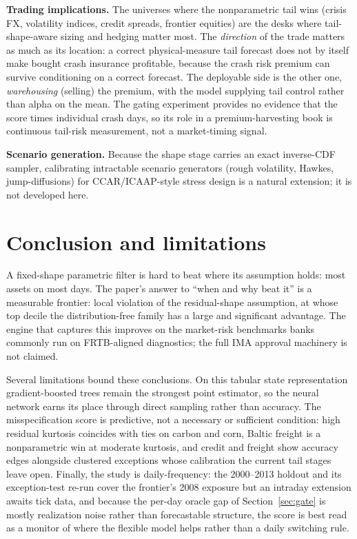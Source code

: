 \documentclass[11pt]{article}
\theoremstyle{remark}
\begin{document}
\textbf{Trading implications.} The universes where the nonparametric tail wins (crisis FX, volatility indices, credit spreads, frontier equities) are the desks where tail-shape-aware
sizing and hedging matter most. The \emph{direction} of the trade matters
as much as its location: a correct physical-measure tail forecast
does not by itself make bought crash insurance profitable, because the
crash risk premium can survive conditioning on a correct forecast.
The deployable side is the other one, \emph{warehousing} (selling) the premium, with the model supplying tail control rather than alpha on the mean. The
gating experiment provides no evidence that the score times individual
crash days, so its role in a premium-harvesting book is continuous
tail-risk measurement, not a market-timing signal.

\textbf{Scenario generation.} Because the shape stage carries an exact
inverse-CDF sampler, calibrating intractable scenario generators
(rough volatility, Hawkes, jump-diffusions) for CCAR/ICAAP-style
stress design is a natural extension; it is not developed here.

\section{Conclusion and limitations}\label{sec:limitations}

A fixed-shape parametric filter is hard to beat where its
assumption holds: most assets on most days. The paper's answer to
``when and why beat it'' is a measurable frontier: local violation of
the residual-shape assumption, at whose top decile the
distribution-free family has a large and significant advantage. The
engine that captures this improves on the market-risk benchmarks banks
commonly run on FRTB-aligned diagnostics; the full IMA approval
machinery is not claimed.

Several limitations bound these conclusions. On this tabular state
representation gradient-boosted trees remain the strongest point
estimator, so the neural network earns its place through direct
sampling rather than accuracy. The misspecification score is
predictive, not a necessary or sufficient condition: high residual
kurtosis coincides with ties on carbon and corn, Baltic freight is a
nonparametric win at moderate kurtosis, and credit and freight show
accuracy edges alongside clustered exceptions whose calibration the
current tail stages leave open. Finally, the study is daily-frequency:
the 2000--2013 holdout and its exception-test re-run cover the
frontier's 2008 exposure but an intraday extension awaits tick data,
and because the per-day oracle gap of Section~\ref{sec:gate} is mostly
realization noise rather than forecastable structure, the score is best
read as a monitor of where the flexible model helps rather than a
daily switching rule.
\end{document}

